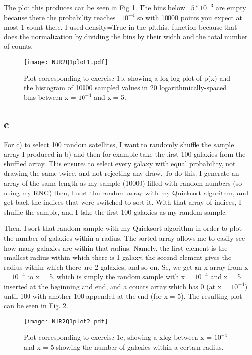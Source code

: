 The plot this produces can be seen in Fig \ref{fig:fig11}. The bins below ~$5*10^{-3}$ are empty because there 
the probability reaches ~$10^{-4}$ so with 10000 points you expect at most 1 count there. 
I used density=True in the plt.hist function because that does the normalization by dividing the bins by 
their width and the total number of counts.

\begin{figure}[h!]
  \centering
  \texttt{[image: NUR2Q1plot1.pdf]}
  \caption{Plot corresponding to exercise 1b, showing a log-log plot of p(x) and the histogram of 10000 
  sampled values in 20 logarithmically-spaced bins between x = $10^{-4}$ and x = 5.}
  \label{fig:fig11}
\end{figure} 


\subsection*{c}

For c) to select 100 random satellites, I want to randomly shuffle the sample array I produced in b) and then for 
example take the first 100 galaxies from the shuffled array. This ensures to select every galaxy with equal
probability, not drawing the same twice, and not rejecting any draw. 
To do this, I generate an array of the same length as my sample (10000) filled with random numbers (so using my RNG)
then, I sort the random array with my Quicksort algorithm, and get back the indices that were switched to sort it.
With that array of indices, I shuffle the sample, and I take the first 100 galaxies as my random sample.

Then, I sort that random sample with my Quicksort algorithm in order to plot the number of galaxies within a radius.
The sorted array allows me to easily see how many galaxies are within that radius. 
Namely, the first element is the smallest radius within which there is 1 galaxy, the second element gives the radius 
within which there are 2 galaxies, and so on. 
So, we get an x array from x = $10^{-4}$ to x = 5, which is simply the random sample with 
x = $10^{-4}$ and x = 5 inserted at the beginning and end, and a counts array which has 0 (at x = $10^{-4}$) 
until 100 with another 100 appended at the end (for x = 5). 
The resulting plot can be seen in Fig. \ref{fig:fig12}.


\begin{figure}[h!]
  \centering
  \texttt{[image: NUR2Q1plot2.pdf]}
  \caption{Plot corresponding to exercise 1c, showing a xlog between x = $10^{-4}$ and x = 5 showing the 
number of galaxies within a certain radius.}
  \label{fig:fig12}
\end{figure} 



